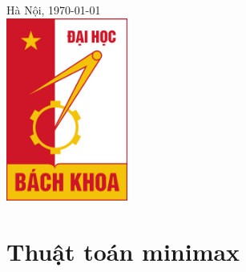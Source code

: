 \documentclass[12pt]{report}
\begin{document}
\begin{titlepage}


{\large Hà Nội, \today}\\[1cm] %


\includegraphics[width=4cm]{hust.jpg}\\[1cm] %
 

\vfill %

\end{titlepage}

\tableofcontents 
\newpage

\newpage
\setcounter{page}{1}

\section{Thuật toán minimax}
\end{document}
